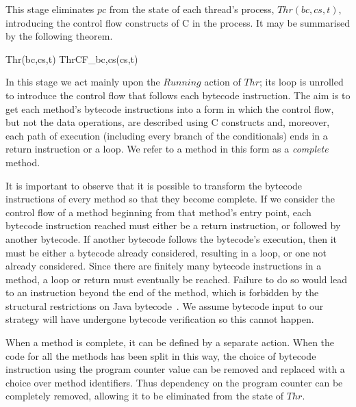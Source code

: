 This stage eliminates $pc$ from the state of each
thread's process, $Thr(bc,cs,t)$, introducing the control flow constructs of C in the
process. 
It may be summarised by the following theorem.
%
\begin{thm}\label{thread-splitting-thm}
  \begin{circus}
    Thr(bc,cs,t) \circrefines ThrCF_{bc,cs}(cs,t)
  \end{circus}%
\end{thm}
%
In this stage we act mainly upon the $Running$ action of $Thr$; its
loop is unrolled to introduce the control flow that follows each
bytecode instruction.
The aim is to get each method's bytecode instructions into a form in
which the control flow, but not the data operations, are described
using C constructs and, moreover, each path of execution (including
every branch of the conditionals) ends in a return instruction or a
loop.
We refer to a method in this form as a \emph{complete} method.

It is important to observe that it is possible to transform the
bytecode instructions of every method so that they become complete.
If we consider the control flow of a method beginning from that
method's entry point, each bytecode instruction reached must either be
a return instruction, or followed by another bytecode.
If another bytecode follows the bytecode's execution, then it must be
either a bytecode already considered, resulting in a loop, or one not
already considered.
Since there are finitely many bytecode instructions in a method, a
loop or return must eventually be reached.
Failure to do so would lead to an instruction beyond the end of the
method, which is forbidden by the structural restrictions on Java
bytecode~\cite{lindholm2014}. 
We assume bytecode input to our strategy will have undergone bytecode
verification so this cannot happen.

When a method is complete, it can be defined by a separate \Circus{}
action.
When the code for all the methods has been split in this way, the
choice of bytecode instruction using the program counter value can be
removed and replaced with a choice over method identifiers.
Thus dependency on the program counter can be completely removed,
allowing it to be eliminated from the state of $Thr$.


